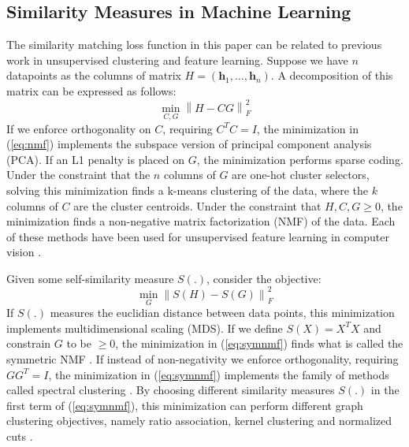 \documentclass{article}
\begin{document}
\subsection{Similarity Measures in Machine Learning}

The similarity matching loss function in this paper can be related to previous work in unsupervised clustering and feature learning. Suppose we have $n$ datapoints as the columns of matrix $H=(\mathbf{h}_1,\ldots,\mathbf{h}_n)$. A decomposition of this matrix can be expressed as follows:
\begin{equation} \label{eq:nmf}                                                                                           
\min_{C,G} \left \| H - CG  \right \|^2_F
\end{equation}
If we enforce orthogonality on $C$, requiring $C^TC = I$, the minimization in (\ref{eq:nmf}) implements the subspace version of principal component analysis (PCA). If an L1 penalty is placed on $G$, the minimization performs sparse coding. Under the constraint that the $n$ columns of $G$ are one-hot cluster selectors, solving this minimization finds a k-means clustering of the data, where the $k$ columns of $C$ are the cluster centroids. Under the constraint that $H,C, G\geq0$, the minimization finds a non-negative matrix factorization (NMF) of the data. Each of these methods have been used for unsupervised feature learning in computer vision \cite{CoatesN11,Raina2007,lee1999learning}.

Given some self-similarity measure $S(.)$, consider the objective:
\begin{equation} \label{eq:symnmf}                                              
\min_{G} \left \| S(H) - S(G) \right \|^2_F
\end{equation}
If $S(.)$ measures the euclidian distance between data points, this minimization implements multidimensional scaling (MDS). If we define $S(X) = X^TX$ and constrain $G$ to be $\geq0$, the minimization in (\ref{eq:symnmf}) finds what is called the symmetric NMF \cite{Kuang2012}. If instead of non-negativity we enforce orthogonality, requiring $GG^T = I$, the minimization in (\ref{eq:symnmf}) implements \cite{Ding2005,Kuang2012} the family of methods called spectral clustering \cite{Ng2002spectral}. By choosing different similarity measures $S(.)$ in the first term of (\ref{eq:symnmf}), this minimization can perform different graph clustering objectives, namely ratio association, kernel clustering and normalized cuts \cite{Kuang2012}.
\end{document}
